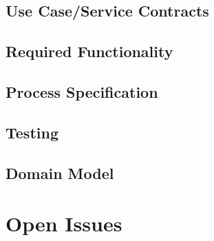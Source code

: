 \documentclass[12pt]{article}
\begin{document}
\subsection{Use Case/Service Contracts}

\subsection{Required Functionality}

\subsection{Process Specification}

\subsection{Testing}

\subsection{Domain Model}


\section{Open Issues}
\end{document}
